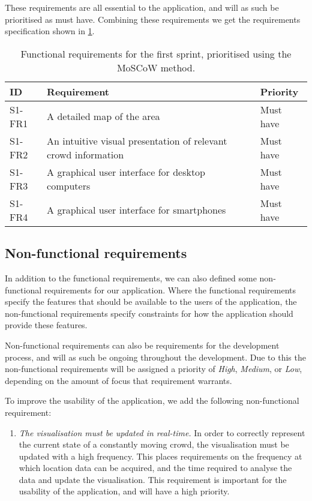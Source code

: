 These requirements are all essential to the application, and will as such be prioritised as must have. Combining these requirements we get the requirements specification shown in \cref{tab:s1_req}.

\begin{table}[h!]
	\centering
	\begin{tabularx}{\textwidth}{lXl}
		\toprule
		\textbf{ID} & \textbf{Requirement} & \textbf{Priority} \\
		\midrule 
		\rowcolor[HTML]{EFEFEF} 
		S1-FR1 & A detailed map of the area & Must have \\
		S1-FR2 & An intuitive visual presentation of relevant crowd information & Must have \\
		\rowcolor[HTML]{EFEFEF} 
		S1-FR3 & A graphical user interface for desktop computers & Must have \\
		S1-FR4 & A graphical user interface for smartphones & Must have \\
		\bottomrule
	\end{tabularx}
	\caption{Functional requirements for the first sprint, prioritised using the MoSCoW method.}
	\label{tab:s1_req}
\end{table}

\subsection{Non-functional requirements} \label{ss:s1_nfreqs}
In addition to the functional requirements, we can also defined some non-functional requirements for our application. Where the functional requirements specify the features that should be available to the users of the application, the non-functional requirements specify constraints for how the application should provide these features. 

Non-functional requirements can also be requirements for the development process, and will as such be ongoing throughout the development. Due to this the non-functional requirements will be assigned a priority of \emph{High}, \emph{Medium}, or \emph{Low}, depending on the amount of focus that requirement warrants. 

To improve the usability of the application, we add the following non-functional requirement:

\begin{enumerate}
    \item \emph{The visualisation must be updated in real-time.} In order to correctly represent the current state of a constantly moving crowd, the visualisation must be updated with a high frequency. This places requirements on the frequency at which location data can be acquired, and the time required to analyse the data and update the visualisation. This requirement is important for the usability of the application, and will have a high priority.
\end{enumerate}

